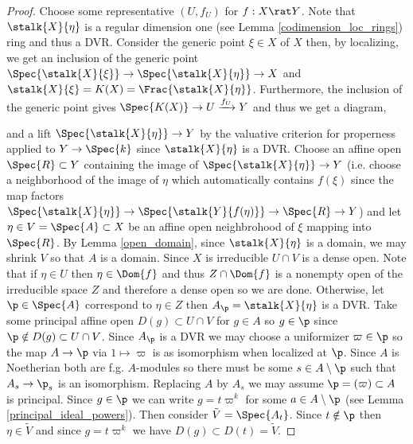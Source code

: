 \documentclass[12pt]{article}
\begin{document}
\begin{proof}
Choose some representative $(U, f_U)$ for $f : X \rat Y$. Note that $\stalk{X}{\eta}$ is a regular dimension one (see Lemma \ref{codimension_loc_rings}) ring and thus a DVR. Consider the generic point $\xi \in X$ of $X$ then, by localizing, we get an inclusion of the generic point $\Spec{\stalk{X}{\xi}} \to \Spec{\stalk{X}{\eta}} \to X$ and $\stalk{X}{\xi} = K(X) = \Frac{\stalk{X}{\eta}}$. Furthermore, the inclusion of the generic point gives $\Spec{K(X)} \to U \xrightarrow{f_U} Y$ and thus we get a diagram,
\begin{center}
\end{center}
and a lift $\Spec{\stalk{X}{\eta}} \to Y$ by the valuative criterion for properness applied to $Y \to \Spec{k}$ since $\stalk{X}{\eta}$ is a DVR. Choose an affine open $\Spec{R} \subset Y$ containing the image of $\Spec{\stalk{X}{\eta}} \to Y$ (i.e. choose a neighborhood of the image of $\eta$ which automatically contains $f(\xi)$ since the map factors $\Spec{\stalk{X}{\eta}} \to \Spec{\stalk{Y}{f(\eta)}} \to \Spec{R} \to Y$) and let $\eta \in V = \Spec{A} \subset X$ be an affine open neighbrohood of $\xi$ mapping into $\Spec{R}$. By Lemma \ref{open_domain}, since $\stalk{X}{\eta}$ is a domain, we may shrink $V$ so that $A$ is a domain. Since $X$ is irreducible $U \cap V$ is a dense open. Note that if $\eta \in U$ then $\eta \in \Dom{f}$ and thus $Z \cap \Dom{f}$ is a nonempty open of the irreducible space $Z$ and therefore a dense open so we are done. Otherwise, let $\p \in \Spec{A}$ correspond to $\eta \in Z$ then $A_\p = \stalk{X}{\eta}$ is a  DVR. Take some principal affine open $D(g) \subset U \cap V$ for $g \in A$ so $g \in \p$ since $\p \notin D(g) \subset U \cap V$. Since $A_\p$ is a DVR we may choose a uniformizer $\varpi \in \p$ so the map $A \to \p$ via $1 \mapsto \varpi$ is as isomorphism when localized at $\p$. Since $A$ is Noetherian both are f.g. $A$-modules so there must be some $s \in A \setminus \p$ such that $A_s \to \p_s$ is an isomorphism. Replacing $A$ by $A_s$ we may assume $\p = (\varpi) \subset A$ is principal. Since $g \in \p$ we can write $g = t \varpi^k$ for some $a \in A \setminus \p$ (see Lemma \ref{principal_ideal_powers}). Then consider $\tilde{V} = \Spec{A_t}$. Since $t \notin \p$ then $\eta \in \tilde{V}$ and since $g = t \varpi^k$ we have $D(g) \subset D(t) = \tilde{V}$.

\end{proof}
\end{document}
